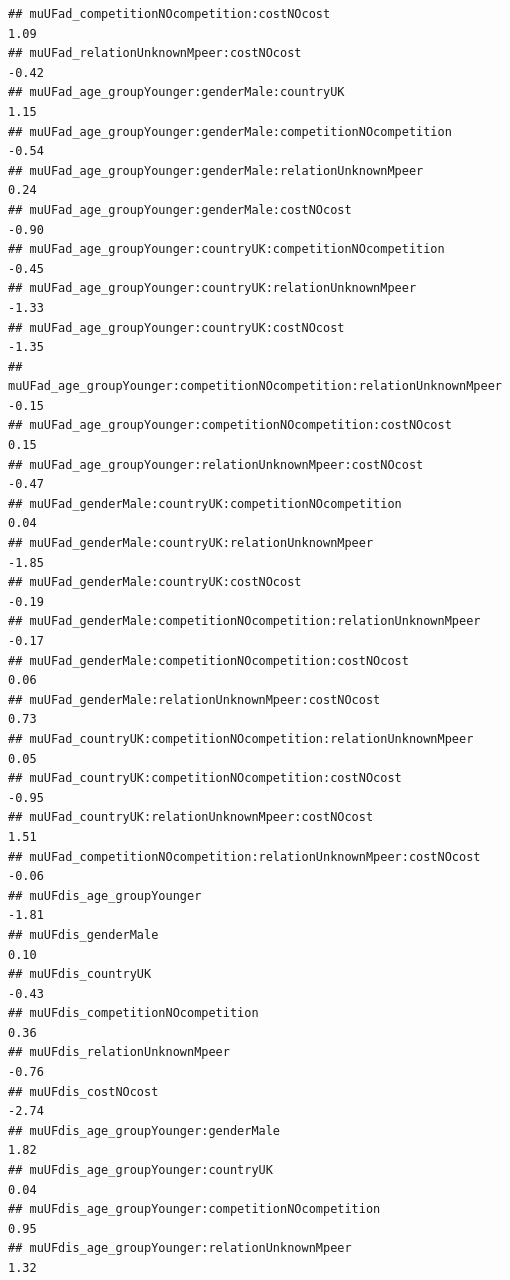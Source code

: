 \documentclass[
]{article}
\begin{document}
\begin{verbatim}
## muUFad_competitionNOcompetition:costNOcost                                 1.09
## muUFad_relationUnknownMpeer:costNOcost                                    -0.42
## muUFad_age_groupYounger:genderMale:countryUK                               1.15
## muUFad_age_groupYounger:genderMale:competitionNOcompetition               -0.54
## muUFad_age_groupYounger:genderMale:relationUnknownMpeer                    0.24
## muUFad_age_groupYounger:genderMale:costNOcost                             -0.90
## muUFad_age_groupYounger:countryUK:competitionNOcompetition                -0.45
## muUFad_age_groupYounger:countryUK:relationUnknownMpeer                    -1.33
## muUFad_age_groupYounger:countryUK:costNOcost                              -1.35
## muUFad_age_groupYounger:competitionNOcompetition:relationUnknownMpeer     -0.15
## muUFad_age_groupYounger:competitionNOcompetition:costNOcost                0.15
## muUFad_age_groupYounger:relationUnknownMpeer:costNOcost                   -0.47
## muUFad_genderMale:countryUK:competitionNOcompetition                       0.04
## muUFad_genderMale:countryUK:relationUnknownMpeer                          -1.85
## muUFad_genderMale:countryUK:costNOcost                                    -0.19
## muUFad_genderMale:competitionNOcompetition:relationUnknownMpeer           -0.17
## muUFad_genderMale:competitionNOcompetition:costNOcost                      0.06
## muUFad_genderMale:relationUnknownMpeer:costNOcost                          0.73
## muUFad_countryUK:competitionNOcompetition:relationUnknownMpeer             0.05
## muUFad_countryUK:competitionNOcompetition:costNOcost                      -0.95
## muUFad_countryUK:relationUnknownMpeer:costNOcost                           1.51
## muUFad_competitionNOcompetition:relationUnknownMpeer:costNOcost           -0.06
## muUFdis_age_groupYounger                                                  -1.81
## muUFdis_genderMale                                                         0.10
## muUFdis_countryUK                                                         -0.43
## muUFdis_competitionNOcompetition                                           0.36
## muUFdis_relationUnknownMpeer                                              -0.76
## muUFdis_costNOcost                                                        -2.74
## muUFdis_age_groupYounger:genderMale                                        1.82
## muUFdis_age_groupYounger:countryUK                                         0.04
## muUFdis_age_groupYounger:competitionNOcompetition                          0.95
## muUFdis_age_groupYounger:relationUnknownMpeer                              1.32

\end{verbatim}
\end{document}
